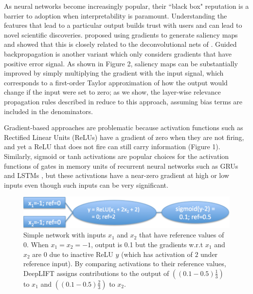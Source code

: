 \documentclass{article}
\begin{document}
As neural networks become increasingly popular, their ``black box" reputation is a barrier to adoption when interpretability is paramount. Understanding the features that lead to a particular output builds trust with users and can lead to novel scientific discoveries. \citet{Simonyan2013-hk} proposed using gradients to generate saliency maps and showed that this is closely related to the deconvolutional nets of \citet{Zeiler2014-sk}. Guided backpropagation \citep{Springenberg2014-gg} is another variant which only considers gradients that have positive error signal. As shown in Figure 2, saliency maps can be substantially improved by simply multiplying the gradient with the input signal, which corresponds to a first-order Taylor approximation of how the output would change if the input were set to zero; as we show, the layer-wise relevance propagation rules described in \citet{Bach2015-pq} reduce to this approach, assuming bias terms are included in the denominators.

Gradient-based approaches are problematic because activation functions such as Rectified Linear Units (ReLUs) have a gradient of zero when they are not firing, and yet a ReLU that does not fire can still carry information (Figure 1). Similarly, sigmoid or tanh activations are popular choices for the activation functions of gates in memory units of recurrent neural networks such as GRUs and LSTMs \citep{Chung2014-uj, Hochreiter1997-yn}, but these activations have a near-zero gradient at high or low inputs even though such inputs can be very significant.

\begin{figure}[!ht]
\vspace{-5px}
\begin{center}
\includegraphics[scale=0.5]{SimpleExample.png}
\caption{Simple network with inputs $x_1$ and $x_2$ that have reference values of 0. When $x_1 = x_2 = -1$, output is 0.1 but the gradients w.r.t $x_1$ and $x_2$ are 0 due to inactive ReLU $y$ (which has activation of $2$ under reference input). By comparing activations to their reference values, DeepLIFT assigns contributions to the output of $\left((0.1-0.5)\frac{1}{3}\right)$ to $x_1$ and $\left((0.1-0.5)\frac{2}{3}\right)$ to $x_2$.}
\end{center}
\vspace{-10px}
\end{figure}
\end{document}
